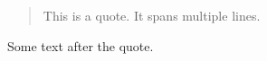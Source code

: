 \begin{quotation}
This is a quote.
It spans multiple lines.
\end{quotation}

Some text after the quote.
